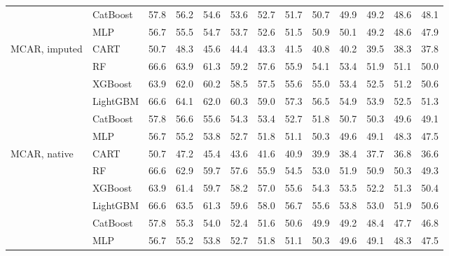\documentclass[pdflatex,sn-mathphys]{sn-jnl}
\theoremstyle{thmstyleone}
\begin{document}
\begin{table}[htbp]
\begin{tabular}{@{}llrrrrrrrrrrr@{}}
 & CatBoost & 57.8 & 56.2 & 54.6 & 53.6 & 52.7 & 51.7 & 50.7 & 49.9 & 49.2 & 48.6 & 48.1 \\
 & MLP & 56.7 & 55.5 & 54.7 & 53.7 & 52.6 & 51.5 & 50.9 & 50.1 & 49.2 & 48.6 & 47.9 \\
\midrule
MCAR, imputed & CART & 50.7 & 48.3 & 45.6 & 44.4 & 43.3 & 41.5 & 40.8 & 40.2 & 39.5 & 38.3 & 37.8 \\
 & RF & 66.6 & 63.9 & 61.3 & 59.2 & 57.6 & 55.9 & 54.1 & 53.4 & 51.9 & 51.1 & 50.0 \\
 & XGBoost & 63.9 & 62.0 & 60.2 & 58.5 & 57.5 & 55.6 & 55.0 & 53.4 & 52.5 & 51.2 & 50.6 \\
 & LightGBM & 66.6 & 64.1 & 62.0 & 60.3 & 59.0 & 57.3 & 56.5 & 54.9 & 53.9 & 52.5 & 51.3 \\
 & CatBoost & 57.8 & 56.6 & 55.6 & 54.3 & 53.4 & 52.7 & 51.8 & 50.7 & 50.3 & 49.6 & 49.1 \\
 & MLP & 56.7 & 55.2 & 53.8 & 52.7 & 51.8 & 51.1 & 50.3 & 49.6 & 49.1 & 48.3 & 47.5 \\
\midrule
MCAR, native & CART & 50.7 & 47.2 & 45.4 & 43.6 & 41.6 & 40.9 & 39.9 & 38.4 & 37.7 & 36.8 & 36.6 \\
 & RF & 66.6 & 62.9 & 59.7 & 57.6 & 55.9 & 54.5 & 53.0 & 51.9 & 50.9 & 50.3 & 49.3 \\
 & XGBoost & 63.9 & 61.4 & 59.7 & 58.2 & 57.0 & 55.6 & 54.3 & 53.5 & 52.2 & 51.3 & 50.4 \\
 & LightGBM & 66.6 & 63.5 & 61.3 & 59.6 & 58.0 & 56.7 & 55.6 & 53.8 & 53.0 & 51.9 & 50.6 \\
 & CatBoost & 57.8 & 55.3 & 54.0 & 52.4 & 51.6 & 50.6 & 49.9 & 49.2 & 48.4 & 47.7 & 46.8 \\
 & MLP & 56.7 & 55.2 & 53.8 & 52.7 & 51.8 & 51.1 & 50.3 & 49.6 & 49.1 & 48.3 & 47.5 \\
\bottomrule
\end{tabular}
\end{table}
\end{document}
